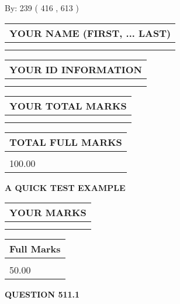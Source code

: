 \documentclass[12pt]{article}
\begin{document}
   
\hspace{1.0in} By: 
 239 ( 416 ,  613 )
   
   
   
   
\newpage 
\setcounter{page}{ 
   511001 } 
   
   
   
   
\noindent\begin{tabular}{|l|}
\hline
YOUR NAME (FIRST, ... LAST)  \\
\hline
 \\ 
 \\ 
\hline
\end{tabular}
\hspace{0.05in} \begin{tabular}{|l|}
\hline
 YOUR   ID   INFORMATION  \\
\hline
 \\ 
 \\ 
\hline
\end{tabular}
   
   
\vspace{0.2in}\noindent\begin{tabular}{|l|}
\hline
YOUR TOTAL MARKS  \\
\hline
 \\ 
 \\ 
\hline
\end{tabular}
\hspace{0.05in} \begin{tabular}{|l|}
\hline
TOTAL FULL MARKS  \\
\hline
 \\ 
100.00 \\
\hline
\end{tabular}
   
   
 \vspace{0.2in}
{\LARGE {\textbf{ A QUICK TEST EXAMPLE}}}
   
   
  
\vspace{0.2in}
  
\noindent\begin{tabular}{|l|}
\hline
 YOUR MARKS  \\
\hline
 \\ 
 \\ 
\hline
\end{tabular}
\hspace{0.05in} \begin{tabular}{|l|}
\hline
 Full Marks  \\
\hline
 \\ 
50.00 \\
\hline
\end{tabular}
{\textbf{\Large{QUESTION
511.1 
}}}
  
\end{document}
